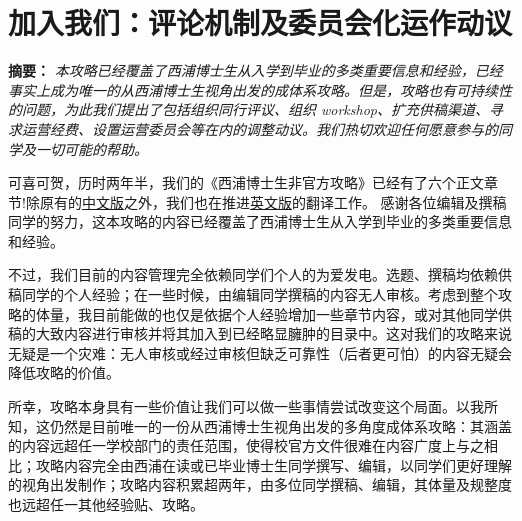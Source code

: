 \section{加入我们：评论机制及委员会化运作动议}
\textbf{摘要：} \textit{本攻略已经覆盖了西浦博士生从入学到毕业的多类重要信息和经验，已经事实上成为唯一的从西浦博士生视角出发的成体系攻略。但是，攻略也有可持续性的问题，为此我们提出了包括组织同行评议、组织 workshop、扩充供稿渠道、寻求运营经费、设置运营委员会等在内的调整动议。我们热切欢迎任何愿意参与的同学及一切可能的帮助。}

可喜可贺，历时两年半，我们的《西浦博士生非官方攻略》已经有了六个正文章节!除原有的\href{https://github.com/xp-pgrs-unofficial-guide/xp_pgrs_unofficial_guide/releases}{中文版}之外，我们也在推进\href{https://github.com/xp-pgrs-unofficial-guide/xp_pgrs_unofficial_guide_EN/releases}{英文版}的翻译工作。
感谢各位编辑及撰稿同学的努力，这本攻略的内容已经覆盖了西浦博士生从入学到毕业的多类重要信息和经验。

不过，我们目前的内容管理完全依赖同学们个人的为爱发电。选题、撰稿均依赖供稿同学的个人经验；在一些时候，由编辑同学撰稿的内容无人审核。考虑到整个攻略的体量，我目前能做的也仅是依据个人经验增加一些章节内容，或对其他同学供稿的大致内容进行审核并将其加入到已经略显臃肿的目录中。这对我们的攻略来说无疑是一个灾难：无人审核或经过审核但缺乏可靠性（后者更可怕）的内容无疑会降低攻略的价值。

所幸，攻略本身具有一些价值让我们可以做一些事情尝试改变这个局面。以我所知，这仍然是目前唯一的一份从西浦博士生视角出发的多角度成体系攻略：其涵盖的内容远超任一学校部门的责任范围，使得校官方文件很难在内容广度上与之相比；攻略内容完全由西浦在读或已毕业博士生同学撰写、编辑，以同学们更好理解的视角出发制作；攻略内容积累超两年，由多位同学撰稿、编辑，其体量及规整度也远超任一其他经验贴、攻略。

\vspace{5mm}

